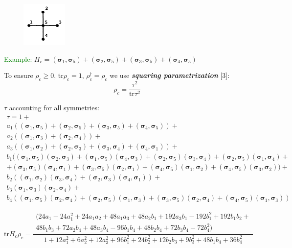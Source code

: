 \documentclass[portratit,a1paper,fontscale=0.58]{baposter} %
\newcommand{\tr}{\mathrm{tr}}
\newcommand{\cc}{{\boldsymbol{\sigma}}}
\begin{document}
\begin{poster}
{\begin{figure}
\includegraphics[width=0.2\textwidth]{cluster-crest.png}
\end{figure}

\vspace{0.5em}

\textcolor{green}{\large Example:} $H_c=(\cc_1,\cc_5)+(\cc_2,\cc_5)+(\cc_3,\cc_5)+(\cc_4,\cc_5)$

\vspace{0.2 em}

To ensure $\rho_c \geq 0$, $\tr \rho_c=1$, $\rho_c^\dagger=\rho_c$ we use {\it \bf squaring parametrization} [3]: $$\rho_c=\frac{\tau^2}{\tr\tau^2}$$

$\tau$ accounting for all symmetries:
$$\begin{gathered}
\tau=1 + \\
a_1 ((\cc_1, \cc_5) + (\cc_2, \cc_5) + (\cc_3, \cc_5) + (\cc_4, \cc_5)) + \\
a_2 ((\cc_1, \cc_3) + (\cc_2, \cc_4)) + \\
a_3 ((\cc_1, \cc_2) + (\cc_2, \cc_3) + (\cc_3, \cc_4) + (\cc_4, \cc_1)) + \\
b_1 ((\cc_1, \cc_5) (\cc_2, \cc_3) + (\cc_1, \cc_5) (\cc_4, \cc_3) + (\cc_2, \cc_5) (\cc_3, \cc_4) + (\cc_2, \cc_5) (\cc_1, \cc_4) + \\
+ (\cc_3, \cc_5) (\cc_4, \cc_1) + (\cc_3, \cc_5) (\cc_2, \cc_1) + (\cc_4, \cc_5) (\cc_1, \cc_2) + (\cc_4, \cc_5) (\cc_3, \cc_2)) + \\
b_2 ((\cc_1, \cc_2) (\cc_3, \cc_4) + (\cc_2, \cc_3) (\cc_4, \cc_1)) + \\
b_3 (\cc_1, \cc_3) (\cc_2, \cc_4) + \\
b_4 ((\cc_1, \cc_5) (\cc_2, \cc_4) + (\cc_2, \cc_5) (\cc_1, \cc_3) + (\cc_3, \cc_5) (\cc_2, \cc_4) + (\cc_4, \cc_5) (\cc_1, \cc_3))
\end{gathered}$$

$$\tr H_c\rho_c = \frac{\begin{gathered}(
24 a_1 - 24 a_1^2 + 24 a_1 a_2 + 48 a_1 a_3 + 48 a_2 b_1 + 192 a_3 b_1 - 192 b_1^2 + 192 b_1 b_2 + \\
48 b_1 b_3 + 72 a_2 b_4 + 48 a_3 b_4 - 96 b_1 b_4 + 48 b_2 b_4 + 72 b_3 b_4 - 72 b_4^2)\end{gathered}}
{1 + 12 a_1^2 + 6 a_2^2 + 12 a_3^2 + 96 b_1^2 + 24 b_2^2 + 12 b_2 b_3 + 9 b_3^2 + 48 b_1 b_4 + 36 b_4^2}$$

}
\end{poster}
\end{document}
